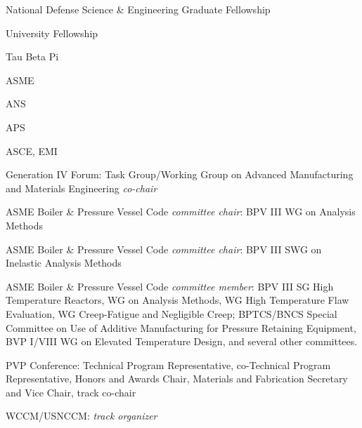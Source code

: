 National Defense Science \& Engineering Graduate Fellowship 

University Fellowship 

Tau Beta Pi 


ASME 

ANS 

APS 

ASCE, EMI 


Generation IV Forum:  Task Group/Working Group on Advanced Manufacturing and Materials Engineering \emph{co-chair} 

ASME Boiler \& Pressure Vessel Code \emph{committee chair}:  BPV III WG on Analysis Methods

ASME Boiler \& Pressure Vessel Code \emph{committee chair}:  BPV III SWG on Inelastic Analysis Methods 

ASME Boiler \& Pressure Vessel Code \emph{committee member}:  BPV III SG High Temperature Reactors,
WG on Analysis Methods, WG High Temperature Flaw Evaluation, 
WG Creep-Fatigue and Negligible Creep; BPTCS/BNCS Special Committee on 
Use of Additive Manufacturing for Pressure Retaining Equipment, BVP I/VIII WG on Elevated Temperature Design, and several other committees.

PVP Conference:  Technical Program Representative, co-Technical Program Representative, Honors and Awards Chair, Materials and Fabrication Secretary and Vice Chair, track co-chair

WCCM/USNCCM:  \emph{track organizer} 

\extra


